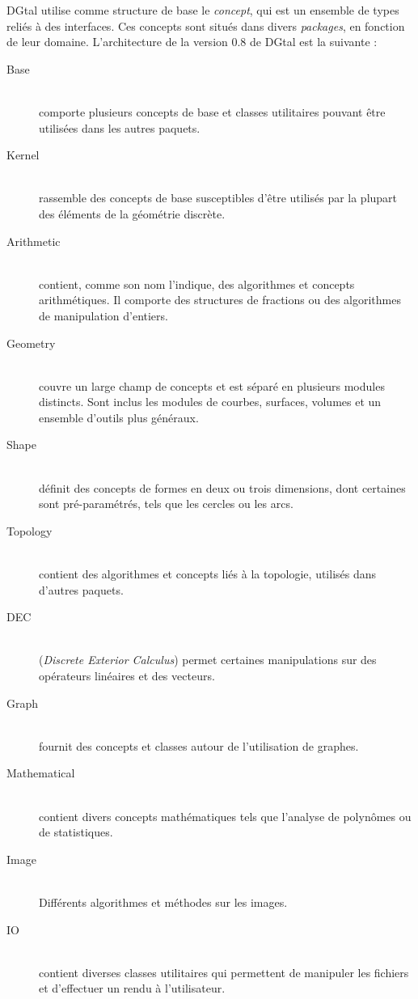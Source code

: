 \documentclass[11pt, french, screen]{report-rd-info}
\begin{document}
DGtal utilise comme structure de base le \emph{concept}, qui est un ensemble de types reliés à des interfaces. Ces concepts sont situés dans divers \emph{packages}, en fonction de leur domaine. L'architecture de la version 0.8 de DGtal est la suivante :
\begin{description}
\item[Base]\hfill \\
comporte plusieurs concepts de base et classes utilitaires pouvant être utilisées dans les autres paquets.

\item[Kernel] \hfill \\
rassemble des concepts de base susceptibles d'être utilisés par la plupart des éléments de la géométrie discrète.

\item[Arithmetic] \hfill \\
contient, comme son nom l'indique, des algorithmes et concepts arithmétiques. Il comporte des structures de fractions ou des algorithmes de manipulation d'entiers.

\item[Geometry] \hfill \\
couvre un large champ de concepts et est séparé en plusieurs modules distincts. Sont inclus les modules de courbes, surfaces, volumes et un ensemble d'outils plus généraux.

\item[Shape] \hfill \\
définit des concepts de formes en deux ou trois dimensions, dont certaines sont pré-paramétrés, tels que les cercles ou les arcs.

\item[Topology]\hfill \\
contient des algorithmes et concepts liés à la topologie, utilisés dans d'autres paquets.

\item[DEC]\hfill \\
(\emph{Discrete Exterior Calculus}) permet certaines manipulations sur des opérateurs linéaires et des vecteurs.

\item[Graph]\hfill \\
fournit des concepts et classes autour de l'utilisation de graphes.

\item[Mathematical]\hfill \\
contient divers concepts mathématiques tels que l'analyse de polynômes ou de statistiques.

\item[Image]\hfill \\
Différents algorithmes et méthodes sur les images.

\item[IO]\hfill \\
contient diverses classes utilitaires qui permettent de manipuler les fichiers et d'effectuer un rendu à l'utilisateur.

\end{description}
\end{document}
